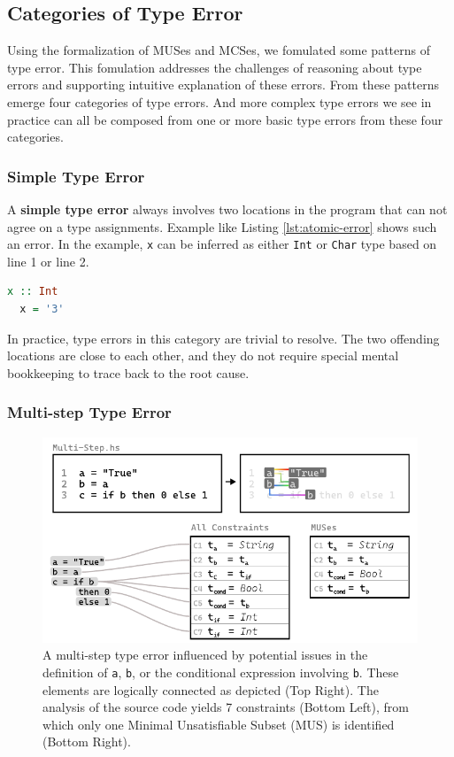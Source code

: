 \documentclass[pdflatex,sn-nature,Numbered]{sn-jnl}%
\begin{document}
\subsection{Categories of Type Error} \label{sec:categories-2}

Using the formalization of MUSes and MCSes, we fomulated some patterns of type error. This fomulation addresses the challenges of reasoning about type errors and supporting intuitive explanation of these errors. From these patterns emerge four categories of type errors. And more complex type errors we see in practice can all be composed from one or more basic type errors from these four categories.

\subsubsection*{Simple Type Error}
A \textbf{simple type error} always involves two locations in the program that can not agree on a type assignments. Example like Listing \ref{lst:atomic-error} shows such an error. In the example, {\tt x} can be inferred as either {\tt Int} or {\tt Char} type based on line 1 or line 2. 

\begin{lstlisting}[language=Haskell, caption=The simplest form of type error, label={lst:atomic-error}]
  x :: Int
  x = '3'
\end{lstlisting}

In practice, type errors in this category are trivial to resolve. The two offending locations are close to each other, and they do not require special mental bookkeeping to trace back to the root cause. 

\subsubsection*{Multi-step Type Error}

\begin{figure}[hbt]
  \centering \includegraphics[width=\linewidth]{images/Multi-Step-MUS}
  \caption {A multi-step type error influenced by potential issues in the definition of \texttt{a}, \texttt{b}, or the conditional expression involving \texttt{b}. These elements are logically connected as depicted (Top Right). The analysis of the source code yields 7 constraints (Bottom Left), from which only one Minimal Unsatisfiable Subset (MUS) is identified (Bottom Right).
  }
  \label{fig:multi-step-2}
  \end{figure}
\end{document}
